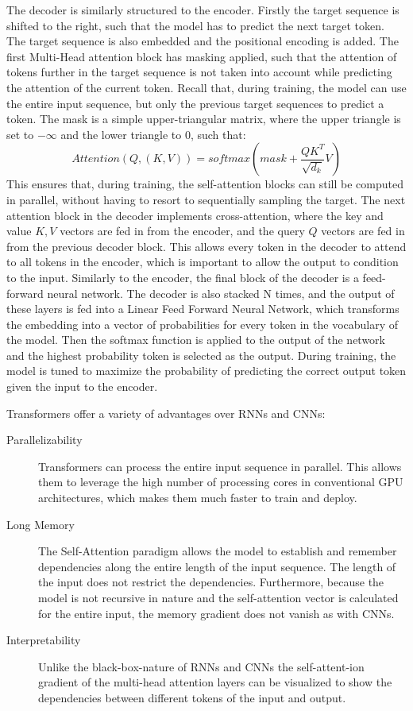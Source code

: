 The decoder is similarly structured to the encoder. Firstly the target sequence is shifted to the right, such that the model has to predict the next target token. The target sequence is also embedded and the positional encoding is added. The first Multi-Head attention block has masking applied, such that the attention of tokens further in the target sequence is not taken into account while predicting the attention of the current token. Recall that, during training, the model can use the entire input sequence, but only the previous target sequences to predict a token. The mask is a simple upper-triangular matrix, where the upper triangle is set to \(-\infty\) and the lower triangle to \(0\), such that: \[ \mathit{Attention}(Q,(K,V)) =  \mathit{softmax}( \mathit{mask} + \frac{QK^T}{\sqrt{d_k}}V)\]
This ensures that, during training, the self-attention blocks can still be computed in parallel, without having to resort to sequentially sampling the target.
The next attention block in the decoder implements cross-attention, where the key and value \(K, V\) vectors are fed in from the encoder, and the query \(Q\) vectors are fed in from the previous decoder block. This allows every token in the decoder to attend to all tokens in the encoder, which is important to allow the output to condition to the input. Similarly to the encoder, the final block of the decoder is a feed-forward neural network. The decoder is also stacked N times, and the output of these layers is fed into a Linear Feed Forward Neural Network, which transforms the embedding into a vector of probabilities for every token in the vocabulary of the model. Then the softmax function is applied to the output of the network and the highest probability token is selected as the output. During training, the model is tuned to maximize the probability of predicting the correct output token given the input to the encoder.

Transformers offer a variety of advantages over RNNs and CNNs:
\begin{description}
    \item[Parallelizability] Transformers can process the entire input sequence in parallel. This allows them to leverage the high number of processing cores in conventional GPU architectures, which makes them much faster to train and deploy.
    \item[Long Memory] The Self-Attention paradigm allows the model to establish and remember dependencies along the entire length of the input sequence. The length of the input does not restrict the dependencies. Furthermore, because the model is not recursive in nature and the self-attention vector is calculated for the entire input, the memory gradient does not vanish as with CNNs.
    \item[Interpretability] Unlike the black-box-nature of RNNs and CNNs the self-attent-ion gradient of the multi-head attention layers can be visualized to show the dependencies between different tokens of the input and output.
\end{description}

